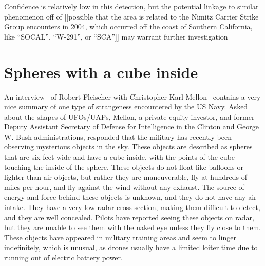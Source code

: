 \begin{svgraybox}
Confidence is relatively low in this detection, but the potential linkage to similar phenomenon off of
[[possible that the area is related to the Nimitz Carrier Strike Group encounters in 2004, which occurred off the coast of Southern California, like ``SOCAL'', ``W-291'', or ``SCA'']]
may warrant further investigation
\end{svgraybox}


\section{Spheres with a cube inside}

An interview~\cite{ExoMagazinTV2022Oct} of Robert Fleischer with Christopher Karl Mellon~ contains a very nice summary of one type of strangeness encountered by the US Navy. Asked about the shapes of UFOs/UAPs, Mellon, a private equity investor, and former Deputy Assistant Secretary of Defense for Intelligence in the Clinton and George W. Bush administrations, responded that the military has recently been observing mysterious objects in the sky. These objects are described as spheres that are six feet wide and have a cube inside, with the points of the cube touching the inside of the sphere. These objects do not float like balloons or lighter-than-air objects, but rather they are maneuverable, fly at hundreds of miles per hour, and fly against the wind without any exhaust. The source of energy and force behind these objects is unknown, and they do not have any air intake. They have a very low radar cross-section, making them difficult to detect, and they are well concealed. Pilots have reported seeing these objects on radar, but they are unable to see them with the naked eye unless they fly close to them. These objects have appeared in military training areas and seem to linger indefinitely, which is unusual, as drones usually have a limited loiter time due to running out of electric battery power.
